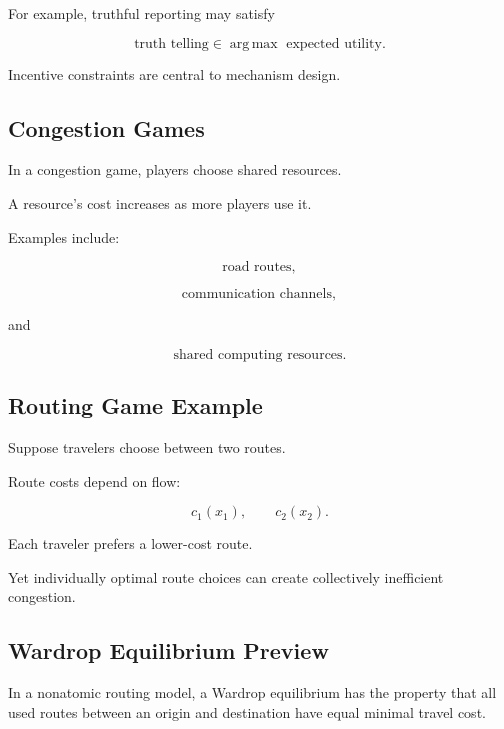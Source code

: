 For example, truthful reporting may satisfy

\[
\boxed{
\text{truth telling}
\in
\operatorname*{arg\,max}
\text{ expected utility}.
}
\]

Incentive constraints are central to mechanism design.

\subsection{Congestion Games}
\label{subsec:congestion-games}

In a congestion game, players choose shared resources.

A resource's cost increases as more players use it.

Examples include:

\[
\boxed{
\text{road routes},
}
\]

\[
\boxed{
\text{communication channels},
}
\]

and

\[
\boxed{
\text{shared computing resources}.
}
\]

\subsection{Routing Game Example}
\label{subsec:routing-game-example}

Suppose travelers choose between two routes.

Route costs depend on flow:

\[
\boxed{
c_1(x_1),
\qquad
c_2(x_2).
}
\]

Each traveler prefers a lower-cost route.

Yet individually optimal route choices can create collectively inefficient
congestion.

\subsection{Wardrop Equilibrium Preview}
\label{subsec:wardrop-equilibrium-preview}

In a nonatomic routing model, a Wardrop equilibrium has the property that
all used routes between an origin and destination have equal minimal
travel cost.

